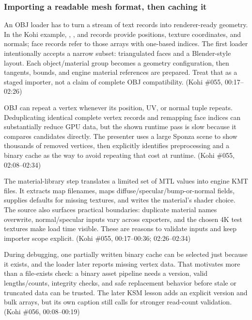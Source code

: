 \subsubsection{Importing a readable mesh format, then caching it}\label{06-engine-ii-ch027-importing-a-readable-mesh-format-then-caching-it}

\hypertarget{06-engine-ii-ch027-importing-a-readable-mesh-format-then-caching-it}{}

An OBJ loader has to turn a stream of text records into renderer-ready geometry. In the Kohi example, , , and  records provide positions, texture coordinates, and normals; face records refer to those arrays with one-based indices. The first loader intentionally accepts a narrow subset: triangulated faces and a Blender-style layout. Each object/material group becomes a geometry configuration, then tangents, bounds, and engine material references are prepared. Treat that as a staged importer, not a claim of complete OBJ compatibility. (Kohi \#055, 00:17--02:26)

OBJ can repeat a vertex whenever its position, UV, or normal tuple repeats. Deduplicating identical complete vertex records and remapping face indices can substantially reduce GPU data, but the shown runtime pass is slow because it compares candidates directly. The presenter uses a large Sponza scene to show thousands of removed vertices, then explicitly identifies preprocessing and a binary cache as the way to avoid repeating that cost at runtime. (Kohi \#055, 02:08--02:34)

The material-library step translates a limited set of MTL values into engine KMT files. It extracts map filenames, maps diffuse/specular/bump-or-normal fields, supplies defaults for missing textures, and writes the material's shader choice. The source also surfaces practical boundaries: duplicate material names overwrite, normal/specular inputs vary across exporters, and the chosen 4K test textures make load time visible. These are reasons to validate inputs and keep importer scope explicit. (Kohi \#055, 00:17--00:36; 02:26--02:34)

During debugging, one partially written binary cache can be selected just because it exists, and the loader later reports missing vertex data. That motivates more than a file-exists check: a binary asset pipeline needs a version, valid lengths/counts, integrity checks, and safe replacement behavior before stale or truncated data can be trusted. The later KSM lesson adds an explicit version and bulk arrays, but its own caption still calls for stronger read-count validation. (Kohi \#056, 00:08--00:19)

